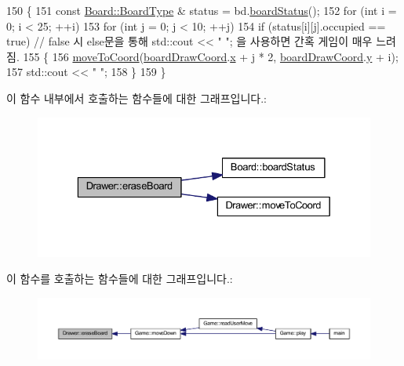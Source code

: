 \begin{DoxyCode}
150     \{
151         \textcolor{keyword}{const} \mbox{\hyperlink{class_board_a84bf794bc185e31e333b78bb003c4bc3}{Board::BoardType}} & status = bd.\mbox{\hyperlink{class_board_ac96b4da16e8dc266b39772f2da3fd7e2}{boardStatus}}();
152         \textcolor{keywordflow}{for} (\textcolor{keywordtype}{int} i = 0; i < 25; ++i)
153             \textcolor{keywordflow}{for} (\textcolor{keywordtype}{int} j = 0; j < 10; ++j)
154                 \textcolor{keywordflow}{if} (status[i][j].occupied == \textcolor{keyword}{true})  \textcolor{comment}{// false 시 else문을 통해 std::cout << "  "; 을 사용하면 간혹 게임이
       매우 느려짐.}
155                 \{
156                     \mbox{\hyperlink{class_drawer_ac1a96e007c07cab2e36a7c78484ee9a6}{moveToCoord}}(\mbox{\hyperlink{tetris__drawer_8h_afe5fa4d0ad1820f448b83de84142af4d}{boardDrawCoord}}.\mbox{\hyperlink{struct_coord_a696eaa744360fc791d0e3b331c549dbe}{x}} + j * 2, 
      \mbox{\hyperlink{tetris__drawer_8h_afe5fa4d0ad1820f448b83de84142af4d}{boardDrawCoord}}.\mbox{\hyperlink{struct_coord_a214166cca70cef7dda9201689c3e81ab}{y}} + i);
157                     std::cout << \textcolor{stringliteral}{"  "};
158                 \}
159     \}
\end{DoxyCode}
이 함수 내부에서 호출하는 함수들에 대한 그래프입니다.\+:
\nopagebreak
\begin{figure}[H]
\begin{center}
\leavevmode
\includegraphics[width=329pt]{class_drawer_ad8b55aff1fbf975536ef3d995d3a4526_cgraph}
\end{center}
\end{figure}
이 함수를 호출하는 함수들에 대한 그래프입니다.\+:
\nopagebreak
\begin{figure}[H]
\begin{center}
\leavevmode
\includegraphics[width=350pt]{class_drawer_ad8b55aff1fbf975536ef3d995d3a4526_icgraph}
\end{center}
\end{figure}
\mbox{\label{class_drawer_a513de5ba9d65771ed21918a90cd70afa}} 
